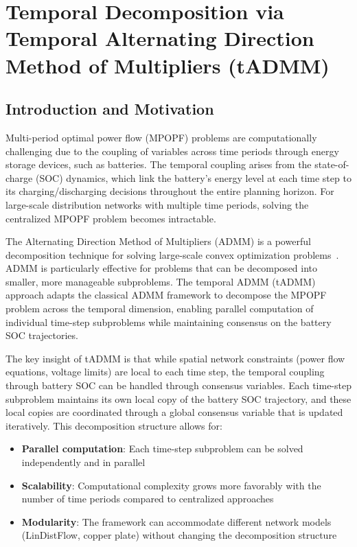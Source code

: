 \clearpage
\section{Temporal Decomposition via Temporal Alternating Direction Method of Multipliers (tADMM)}

\subsection{Introduction and Motivation}

Multi-period optimal power flow (MPOPF) problems are computationally challenging due to the coupling of variables across time periods through energy storage devices, such as batteries. The temporal coupling arises from the state-of-charge (SOC) dynamics, which link the battery's energy level at each time step to its charging/discharging decisions throughout the entire planning horizon. For large-scale distribution networks with multiple time periods, solving the centralized MPOPF problem becomes intractable.

The Alternating Direction Method of Multipliers (ADMM) is a powerful decomposition technique for solving large-scale convex optimization problems~\cite{admm_boyd_website, admm_cmu_notes}. ADMM is particularly effective for problems that can be decomposed into smaller, more manageable subproblems. The temporal ADMM (tADMM) approach adapts the classical ADMM framework to decompose the MPOPF problem across the temporal dimension, enabling parallel computation of individual time-step subproblems while maintaining consensus on the battery SOC trajectories.

The key insight of tADMM is that while spatial network constraints (power flow equations, voltage limits) are local to each time step, the temporal coupling through battery SOC can be handled through consensus variables. Each time-step subproblem maintains its own local copy of the battery SOC trajectory, and these local copies are coordinated through a global consensus variable that is updated iteratively. This decomposition structure allows for:
\begin{itemize}
    \item \textbf{Parallel computation}: Each time-step subproblem can be solved independently and in parallel
    \item \textbf{Scalability}: Computational complexity grows more favorably with the number of time periods compared to centralized approaches
    \item \textbf{Modularity}: The framework can accommodate different network models (LinDistFlow, copper plate) without changing the decomposition structure
\end{itemize}

